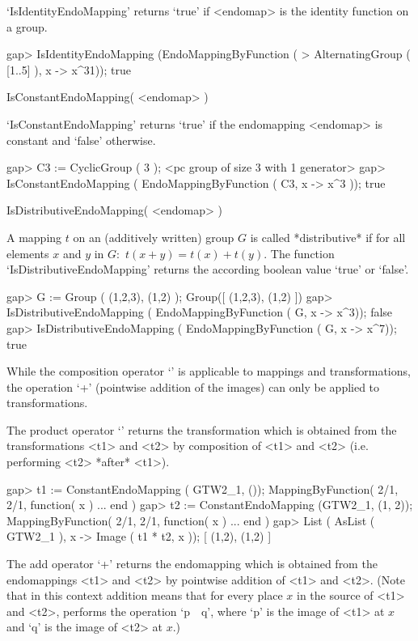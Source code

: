 `IsIdentityEndoMapping' returns `true' if <endomap> is the identity
function on a group.

\beginexample
    gap> IsIdentityEndoMapping (EndoMappingByFunction ( 
    > AlternatingGroup ( [1..5] ), x -> x^31));
    true
\endexample

\>IsConstantEndoMapping( <endomap> )

`IsConstantEndoMapping' returns `true' if the endomapping
<endomap> is constant and `false' otherwise.

\beginexample
    gap> C3 := CyclicGroup ( 3 );
    <pc group of size 3 with 1 generator>
    gap> IsConstantEndoMapping ( EndoMappingByFunction ( C3,  x -> x^3 ));
    true
\endexample

\>IsDistributiveEndoMapping( <endomap> )

A mapping $t$ on an (additively written) group $G$ is called
*distributive* if for all elements $x$ and $y$ in $G$:\
$t(x+y) = t(x) + t(y)$.
The function `IsDistributiveEndoMapping' returns the according
boolean value `true' or `false'.

\beginexample
    gap> G := Group ( (1,2,3), (1,2) );
    Group([ (1,2,3), (1,2) ])
    gap> IsDistributiveEndoMapping ( EndoMappingByFunction ( G, x -> x^3));
    false
    gap> IsDistributiveEndoMapping ( EndoMappingByFunction ( G, x -> x^7));
    true
\endexample

\Section{Operations for endo mappings}


While the composition operator `\*' is applicable to mappings and
transformations, the operation `+' (pointwise addition of the images) can
only be applied to transformations.

The product operator `\*' returns the transformation which is obtained 
from the transformations <t1> and <t2> by composition of <t1> and <t2>
(i.e. performing <t2> *after* <t1>).

\beginexample
    gap> t1 := ConstantEndoMapping ( GTW2_1, ());
    MappingByFunction( 2/1, 2/1, function( x ) ... end )
    gap> t2 := ConstantEndoMapping (GTW2_1, (1, 2));
    MappingByFunction( 2/1, 2/1, function( x ) ... end )
    gap> List ( AsList ( GTW2_1 ), x -> Image ( t1 * t2, x ));
    [ (1,2), (1,2) ]
\endexample

The add operator `+' returns the endomapping which is obtained 
from the endomappings <t1> and <t2> by pointwise addition 
of <t1> and <t2>. (Note that in this context addition means that
for every place $x$ in the source of <t1> and <t2>,   
{\GAP} performs the  operation `p\ \*\ q', where
`p' is the image of <t1> at $x$ and `q' is the image of <t2> at $x$.) 

